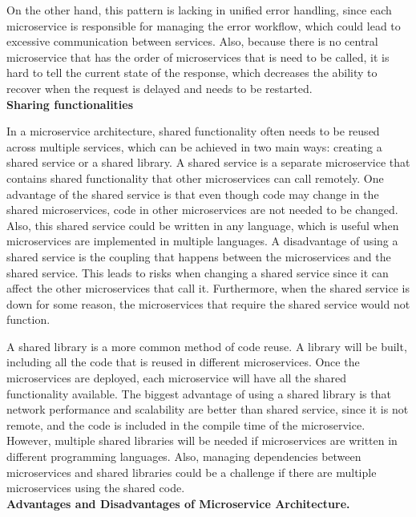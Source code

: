 On the other hand, this pattern is lacking in unified error handling, since each microservice is responsible for managing the error workflow,
which could lead to excessive communication between services. Also, because there is no central microservice that has the order
of microservices that is need to be called, it is hard to tell the current state of the response, which decreases the ability to recover
when the request is delayed and needs to be restarted.\\


\noindent \textbf{Sharing functionalities}

In a microservice architecture, shared functionality often needs to be reused across multiple services, which can be achieved in two main ways:
creating a shared service or a shared library.
A shared service is a separate microservice that contains shared functionality that other microservices can call remotely.
One advantage of the shared service is that even though code may change in the shared microservices, code in other microservices are not needed to be changed.
Also, this shared service could be written in any language, which is useful when microservices are implemented in multiple languages.
A disadvantage of using a shared service is the coupling that happens between the microservices and the shared service.
This leads to risks when changing a shared service since it can affect the other microservices that call it.
Furthermore, when the shared service is down for some reason, the microservices that require the shared service would not function.


A shared library is a more common method of code reuse. A library will be built, including all the code that is reused in different microservices.
Once the microservices are deployed, each microservice will have all the shared functionality available.
The biggest advantage of using a shared library is that network performance and scalability are better than shared service,
since it is not remote, and the code is included in the compile time of the microservice.
However, multiple shared libraries will be needed if microservices are written in different programming languages.
Also, managing dependencies between microservices and shared libraries could be a challenge if there are multiple microservices using the shared code.\\


\noindent \textbf{Advantages and Disadvantages of Microservice Architecture.}

